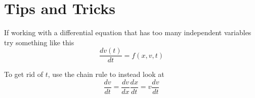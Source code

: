 \section{Tips and Tricks}

If working with a differential equation that has too many independent variables try something like this
$$
\frac{dv(t)}{dt} = f(x,v,t)
$$

To get rid of $t$, use the chain rule to instead look at
$$
\frac{dv}{dt} = \frac{dv}{dx} \frac{dx}{dt} = v \frac{dv}{dt}
$$
\\~\\